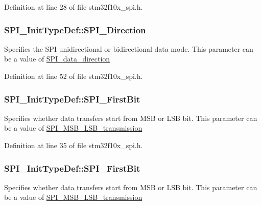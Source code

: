 Definition at line 28 of file stm32f10x\+\_\+spi.\+h.

\subsubsection[{\texorpdfstring{S\+P\+I\+\_\+\+Direction}{SPI_Direction}}]{ S\+P\+I\+\_\+\+Init\+Type\+Def\+::\+S\+P\+I\+\_\+\+Direction}\hypertarget{struct_s_p_i___init_type_def_a8cf0fefa76b9238a41997db14eac62a9}{}\label{struct_s_p_i___init_type_def_a8cf0fefa76b9238a41997db14eac62a9}
Specifies the S\+PI unidirectional or bidirectional data mode. This parameter can be a value of \hyperlink{group___s_p_i__data__direction}{S\+P\+I\+\_\+data\+\_\+direction} 

Definition at line 52 of file stm32f10x\+\_\+spi.\+h.

\subsubsection[{\texorpdfstring{S\+P\+I\+\_\+\+First\+Bit}{SPI_FirstBit}}]{ S\+P\+I\+\_\+\+Init\+Type\+Def\+::\+S\+P\+I\+\_\+\+First\+Bit}\hypertarget{struct_s_p_i___init_type_def_ae6237c6504f3876249b4ee06f51a9847}{}\label{struct_s_p_i___init_type_def_ae6237c6504f3876249b4ee06f51a9847}
Specifies whether data transfers start from M\+SB or L\+SB bit. This parameter can be a value of \hyperlink{group___s_p_i___m_s_b___l_s_b__transmission}{S\+P\+I\+\_\+\+M\+S\+B\+\_\+\+L\+S\+B\+\_\+transmission} 

Definition at line 35 of file stm32f10x\+\_\+spi.\+h.

\subsubsection[{\texorpdfstring{S\+P\+I\+\_\+\+First\+Bit}{SPI_FirstBit}}]{ S\+P\+I\+\_\+\+Init\+Type\+Def\+::\+S\+P\+I\+\_\+\+First\+Bit}\hypertarget{struct_s_p_i___init_type_def_ace7ca292c290953f8a6ae86f79949f5b}{}\label{struct_s_p_i___init_type_def_ace7ca292c290953f8a6ae86f79949f5b}
Specifies whether data transfers start from M\+SB or L\+SB bit. This parameter can be a value of \hyperlink{group___s_p_i___m_s_b___l_s_b__transmission}{S\+P\+I\+\_\+\+M\+S\+B\+\_\+\+L\+S\+B\+\_\+transmission} 

